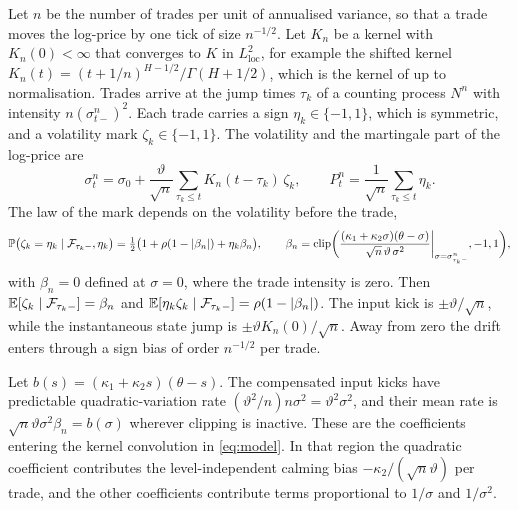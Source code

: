 Let $n$ be the number of trades per unit of annualised variance, so that a trade moves the log-price by one tick of size $n^{-1/2}$. Let $K_n$ be a kernel with $K_n(0)<\infty$ that converges to $K$ in $L^2_{\mathrm{loc}}$, for example the shifted kernel $K_n(t)=(t+1/n)^{H-1/2}/\Gamma(H+1/2)$, which is the kernel of \citet{HagerHorstWagenhoferXu2026} up to normalisation. Trades arrive at the jump times $\tau_k$ of a counting process $N^n$ with intensity $n(\sigma^n_{t-})^2$. Each trade carries a sign $\eta_k\in\{-1,1\}$, which is symmetric, and a volatility mark $\zeta_k\in\{-1,1\}$. The volatility and the martingale part of the log-price are
\begin{equation}\label{eq:micro}
\sigma^n_t=\sigma_0+\frac{\vartheta}{\sqrt n}\sum_{\tau_k\le t}K_n(t-\tau_k)\,\zeta_k,\qquad P^n_t=\frac1{\sqrt n}\sum_{\tau_k\le t}\eta_k .
\end{equation}
The law of the mark depends on the volatility before the trade,
\begin{equation}\label{eq:bias}
\P\big(\zeta_k=\eta_k\mid\F_{\tau_k-},\eta_k\big)=\tfrac12\big(1+\rho(1-|\beta_n|)+\eta_k\beta_n\big),\qquad \beta_n=\mathrm{clip}\bigg(\frac{(\kappa_1+\kappa_2\sigma)(\theta-\sigma)}{\sqrt n\,\vartheta\,\sigma^2}\bigg|_{\sigma=\sigma^n_{\tau_k-}},-1,1\bigg),
\end{equation}
with $\beta_n=0$ defined at $\sigma=0$, where the trade intensity is zero. Then $\mathbb{E}[\zeta_k\mid\mathcal{F}_{\tau_k-}]=\beta_n$ and $\mathbb{E}[\eta_k\zeta_k\mid\mathcal{F}_{\tau_k-}]=\rho(1-|\beta_n|)$. The input kick is $\pm\vartheta/\sqrt n$, while the instantaneous state jump is $\pm\vartheta K_n(0)/\sqrt n$. Away from zero the drift enters through a sign bias of order $n^{-1/2}$ per trade.

Let $b(s)=(\kappa_1+\kappa_2s)(\theta-s)$. The compensated input kicks have predictable quadratic-variation rate $(\vartheta^2/n)n\sigma^2=\vartheta^2\sigma^2$, and their mean rate is $\sqrt n\vartheta\sigma^2\beta_n=b(\sigma)$ wherever clipping is inactive. These are the coefficients entering the kernel convolution in \eqref{eq:model}. In that region the quadratic coefficient contributes the level-independent calming bias $-\kappa_2/(\sqrt n\vartheta)$ per trade, and the other coefficients contribute terms proportional to $1/\sigma$ and $1/\sigma^2$.

